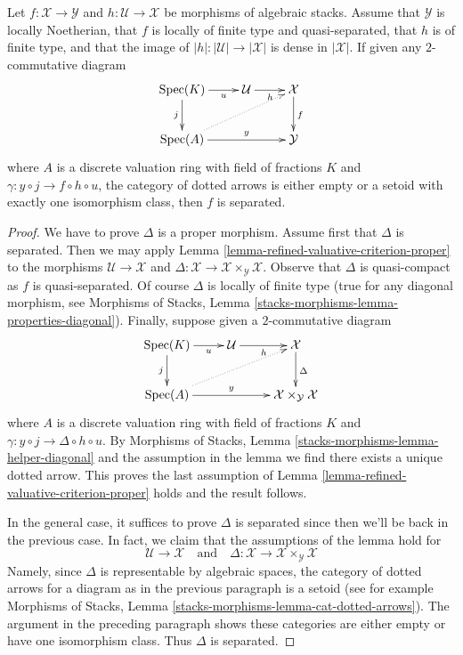 \begin{lemma}
\label{lemma-refined-valuative-criterion-separated}
Let $f : \mathcal{X} \to \mathcal{Y}$ and $h : \mathcal{U} \to \mathcal{X}$
be morphisms of algebraic stacks. Assume that $\mathcal{Y}$ is
locally Noetherian, that $f$ is locally of finite type and quasi-separated,
that $h$ is of finite type, and that the image of
$|h| : |\mathcal{U}| \to |\mathcal{X}|$ is dense in $|\mathcal{X}|$.
If given any $2$-commutative diagram
$$
\xymatrix{
\Spec(K) \ar[r]_-u \ar[d]_j & \mathcal{U} \ar[r]_h & \mathcal{X} \ar[d]^f \\
\Spec(A) \ar[rr]^-y \ar@{..>}[rru] & & \mathcal{Y}
}
$$
where $A$ is a discrete valuation ring with field of fractions $K$
and $\gamma : y \circ j \to f \circ h \circ u$, the category
of dotted arrows is either empty or a setoid with exactly
one isomorphism class, then $f$ is separated.
\end{lemma}

\begin{proof}
We have to prove $\Delta$ is a proper morphism.
Assume first that $\Delta$ is separated. Then we may apply
Lemma \ref{lemma-refined-valuative-criterion-proper}
to the morphisms $\mathcal{U} \to \mathcal{X}$ and
$\Delta : \mathcal{X} \to \mathcal{X} \times_\mathcal{Y} \mathcal{X}$.
Observe that $\Delta$ is quasi-compact as $f$ is quasi-separated.
Of course $\Delta$ is locally of finite type (true for any
diagonal morphism, see Morphisms of Stacks, Lemma
\ref{stacks-morphisms-lemma-properties-diagonal}).
Finally, suppose given a $2$-commutative diagram
$$
\xymatrix{
\Spec(K) \ar[r]_-u \ar[d]_j &
\mathcal{U} \ar[r]_h &
\mathcal{X} \ar[d]^\Delta \\
\Spec(A) \ar[rr]^-y \ar@{..>}[rru] & &
\mathcal{X} \times_\mathcal{Y} \mathcal{X}
}
$$
where $A$ is a discrete valuation ring with field of fractions $K$
and $\gamma : y \circ j \to \Delta \circ h \circ u$.
By Morphisms of Stacks, Lemma \ref{stacks-morphisms-lemma-helper-diagonal}
and the assumption in the lemma
we find there exists a unique dotted arrow.
This proves the last assumption of
Lemma \ref{lemma-refined-valuative-criterion-proper}
holds and the result follows.

\medskip\noindent
In the general case, it suffices to prove $\Delta$ is separated
since then we'll be back in the previous case. In fact, we claim
that the assumptions of the lemma hold for
$$
\mathcal{U} \to \mathcal{X}
\quad\text{and}\quad
\Delta :
\mathcal{X} \to
\mathcal{X} \times_\mathcal{Y} \mathcal{X}
$$
Namely, since $\Delta$ is representable by algebraic spaces, the
category of dotted arrows for a diagram as in the previous paragraph
is a setoid (see for example
Morphisms of Stacks, Lemma \ref{stacks-morphisms-lemma-cat-dotted-arrows}).
The argument in the preceding paragraph shows these categories
are either empty or have one isomorphism class.
Thus $\Delta$ is separated.
\end{proof}

